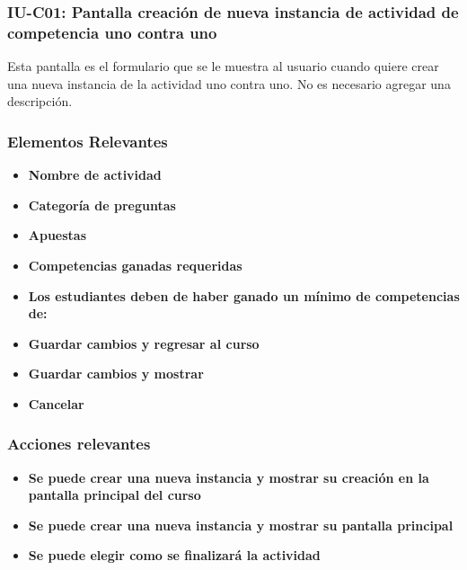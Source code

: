 
\subsubsection{IU-C01: Pantalla creación de nueva instancia de actividad de competencia uno contra uno}

Esta pantalla es el formulario que se le muestra al usuario cuando quiere crear una nueva instancia de la actividad uno contra uno. No es necesario agregar una descripción.


\subsubsection{Elementos Relevantes}

    \begin{itemize}
    \item {\bf Nombre de actividad}
    \item {\bf Categoría de preguntas}
    \item {\bf Apuestas}
    \item {\bf Competencias ganadas requeridas}
    \item {\bf Los estudiantes deben de haber ganado un mínimo de competencias de:}
    \item {\bf Guardar cambios y regresar al curso}
    \item {\bf Guardar cambios y mostrar}
    \item {\bf Cancelar}
    \end{itemize}

\subsubsection{Acciones relevantes}

    \begin{itemize}
    \item {\bf Se puede crear una nueva instancia y mostrar su creación en la pantalla principal del curso}
    \item {\bf Se puede crear una nueva instancia y mostrar su pantalla principal}
    \item {\bf Se puede elegir como se finalizará la actividad}
    \end{itemize}

\clearpage
